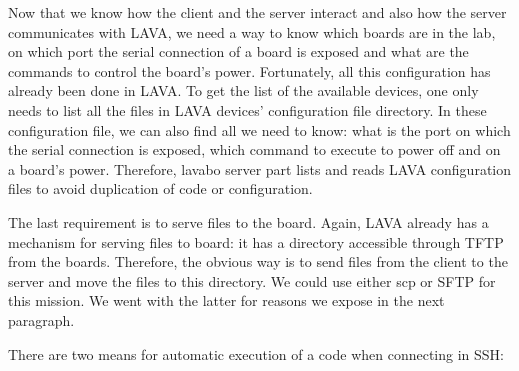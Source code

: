 Now that we know how the client and the server interact and also how the server communicates with LAVA, we need a way to know which boards are in the lab, on which port the serial connection of a board is exposed and what are the commands to control the board's power. Fortunately, all this configuration has already been done in LAVA. To get the list of the available devices, one only needs to list all the files in LAVA devices' configuration file directory. In these configuration file, we can also find all we need to know: what is the port on which the serial connection is exposed, which command to execute to power off and on a board's power. Therefore, lavabo server part lists and reads LAVA configuration files to avoid duplication of code or configuration.

The last requirement is to serve files to the board. Again, LAVA already has a mechanism for serving files to board: it has a directory accessible through TFTP from the boards. Therefore, the obvious way is to send files from the client to the server and move the files to this directory. We could use either scp or SFTP for this mission. We went with the latter for reasons we expose in the next paragraph.

There are two means for automatic execution of a code when connecting in SSH:

